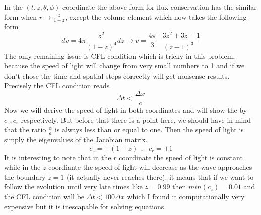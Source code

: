 \documentclass[a4paper,11pt]{article}
\begin{document}
 In the $(t,z,\theta,\phi)$ coordinate the above form for flux conservation has the similar form when $r\rightarrow\frac{z}{1-z}$, except the volume element which now takes the following form 
 \begin{equation*}
 dv=4\pi \frac{z^2}{(1-z)^4} dz\rightarrow v=\frac{4\pi}{3}\frac{-3z^2+3z-1}{(z-1)^3}
 \end{equation*}
 The only remaining issue is CFL condition which is tricky in this problem, because the speed of light will change from very small numbers to 1 and if we don't chose the time and spatial steps correctly will get nonsense results. Precisely the CFL condition reads
 \begin{equation}
 \Delta t< \frac{\Delta x}{c}
 \end{equation}
 Now we will derive the speed of light in both coordinates and will show the by $c_z,c_r$ respectively. But before that there is a point here, we should have in mind that the ratio $\frac{\alpha}{a}$ is always less than or equal to one. Then the speed of light is simply the eigenvalues of the Jacobian matrix.
 \begin{equation}
 	c_z=\pm (1-z)~~,~~~c_r=\pm 1
 \end{equation}
 It is interesting to note that in the $r$ coordinate the speed of light is constant while in the $z$ coordiante the speed of light will decrease as the wave approaches the boundary $z=1$ (it actually never reaches there). it means that if we want to follow the evolution until very late times like $z=0.99$ then $min(c_z)=0.01$ and the CFL condition will be $\Delta t< 100 \Delta x$ which I found it computationally very expensive but it is inescapable for solving equations.
\end{document}
